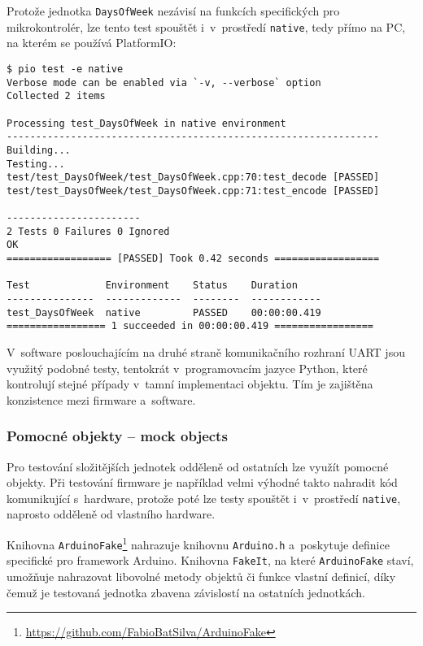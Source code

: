 Protože jednotka \texttt{DaysOfWeek} nezávisí na funkcích specifických pro
mikrokontrolér, lze tento test spouštět i~v~prostředí \texttt{native}, tedy
přímo na PC, na kterém se používá PlatformIO:
\begin{lstlisting}[style=terminal,columns=fixed]
$ pio test -e native
Verbose mode can be enabled via `-v, --verbose` option
Collected 2 items

Processing test_DaysOfWeek in native environment
----------------------------------------------------------------
Building...
Testing...
test/test_DaysOfWeek/test_DaysOfWeek.cpp:70:test_decode	[PASSED]
test/test_DaysOfWeek/test_DaysOfWeek.cpp:71:test_encode	[PASSED]

-----------------------
2 Tests 0 Failures 0 Ignored
OK
================== [PASSED] Took 0.42 seconds ==================

Test             Environment    Status    Duration
---------------  -------------  --------  ------------
test_DaysOfWeek  native         PASSED    00:00:00.419
================= 1 succeeded in 00:00:00.419 =================
\end{lstlisting}

V~software poslouchajícím na druhé straně komunikačního rozhraní UART jsou
využitý podobné testy, tentokrát v~programovacím jazyce Python, které
kontrolují stejné případy v~tamní implementaci objektu. Tím je zajištěna
konzistence mezi firmware a~software.


\subsubsection{Pomocné objekty -- mock objects}
Pro testování složitějších jednotek odděleně od ostatních lze využít pomocné
objekty. Při testování firmware je například velmi výhodné takto nahradit kód
komunikující s~hardware, protože poté lze testy spouštět i~v~prostředí
\texttt{native}, naprosto odděleně od vlastního hardware.

Knihovna
\texttt{ArduinoFake}\footnote{\url{https://github.com/FabioBatSilva/ArduinoFake}}
nahrazuje knihovnu \texttt{Arduino.h} a~poskytuje definice specifické pro
framework Arduino. Knihovna \texttt{FakeIt}, na které \texttt{ArduinoFake}
staví, umožňuje nahrazovat libovolné metody objektů či funkce vlastní definicí,
díky čemuž je testovaná jednotka zbavena závislostí na ostatních jednotkách.

